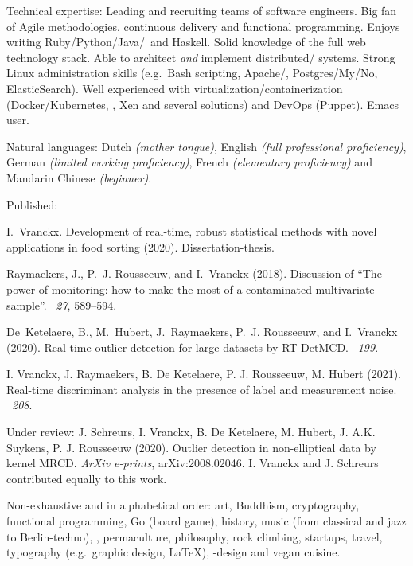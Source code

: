 \documentclass[10pt,a4paper]{article}
\begin{document}

\inlineheadsection  %
  {Technical expertise:}
  {Leading and recruiting teams of software engineers.  Big fan of Agile methodologies, continuous delivery and functional programming.  Enjoys writing Ruby/\nsp Python/\nsp Java/\nsp \CPP~and Haskell.  Solid knowledge of the full web technology stack.  Able to architect \textit{and} implement distributed/ systems.  Strong Linux administration skills (e.g.\ Bash scripting, Apache/, Postgres/My/No, ElasticSearch).  Well experienced with virtualization/containerization (Docker/Kubernetes, , Xen and several  solutions) and DevOps (Puppet).  Emacs user.}

\vspace{0.5em}
\inlineheadsection
  {Natural languages:}
  {Dutch \emph{(mother tongue)}, English \emph{(full professional proficiency)}, German \emph{(limited working proficiency)}, French \emph{(elementary proficiency)} and Mandarin Chinese \emph{(beginner)}.}


\spacedhrule{1.6em}{-0.4em}


\inlineheadsection  %
{Published:}
{
	I.~Vranckx. Development of real-time, robust statistical methods with novel applications in food sorting (2020). Dissertation-thesis.
	
	\hangindent=3.5mm
	Raymaekers, J., P.~J. Rousseeuw, and I.~Vranckx (2018).
	\newblock Discussion of ``{T}he power of monitoring: how to make the most of a contaminated multivariate sample''.
	~{\em 27}, 589--594. 
	
	De~Ketelaere, B., M.~Hubert, J.~Raymaekers, P.~J. Rousseeuw, and I.~Vranckx	(2020).
	\newblock Real-time outlier detection for large datasets by {RT-DetMCD}.
	~{\em 199}. 
	
	I. Vranckx, J. Raymaekers, B. De Ketelaere, P. J. Rousseeuw, M. Hubert (2021).
	\newblock Real-time discriminant analysis in the presence of label and measurement noise.
	~{\em 208}.
}
\vspace{0.5em}
\inlineheadsection
{Under review:}
{J. Schreurs, I. Vranckx, B. De Ketelaere, M. Hubert, J. A.K. Suykens, P. J. Rousseeuw (2020). Outlier detection in non-elliptical data by kernel MRCD. \textit{ArXiv e-prints}, arXiv:2008.02046. I. Vranckx and J. Schreurs contributed equally to this work.}

\spacedhrule{1.6em}{-0.4em}


\inlineheadsection
  {Non-exhaustive and in alphabetical order:}
  {art, Buddhism, cryptography, functional programming, Go (board game), history, music (from classical and jazz to Berlin-techno), , permaculture, philosophy, rock climbing, startups, travel, typography (e.g.\ graphic design, \LaTeX), -design and vegan cuisine.}
\end{document}
